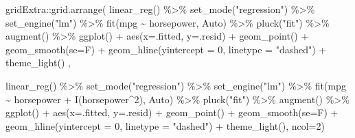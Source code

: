 \documentclass[
  letterpaper,
  DIV=11,
  numbers=noendperiod]{scrreprt}
\newenvironment{Shaded}{\begin{snugshade}}{\end{snugshade}}
\newcommand{\AttributeTok}[1]{\textcolor[rgb]{0.65,0.35,0.00}{#1}}
\newcommand{\DecValTok}[1]{\textcolor[rgb]{0.47,0.16,0.63}{#1}}
\newcommand{\FunctionTok}[1]{\textcolor[rgb]{0.02,0.16,0.49}{#1}}
\newcommand{\NormalTok}[1]{\textcolor[rgb]{0.33,0.33,0.33}{#1}}
\newcommand{\SpecialCharTok}[1]{\textcolor[rgb]{0.00,0.46,0.62}{#1}}
\newcommand{\StringTok}[1]{\textcolor[rgb]{0.00,0.50,0.00}{#1}}
\begin{document}
\begin{Shaded}
\begin{Highlighting}[]
\NormalTok{gridExtra}\SpecialCharTok{::}\FunctionTok{grid.arrange}\NormalTok{(}
\FunctionTok{linear\_reg}\NormalTok{() }\SpecialCharTok{\%\textgreater{}\%} 
  \FunctionTok{set\_mode}\NormalTok{(}\StringTok{"regression"}\NormalTok{) }\SpecialCharTok{\%\textgreater{}\%} 
  \FunctionTok{set\_engine}\NormalTok{(}\StringTok{"lm"}\NormalTok{) }\SpecialCharTok{\%\textgreater{}\%} 
  \FunctionTok{fit}\NormalTok{(mpg }\SpecialCharTok{\textasciitilde{}}\NormalTok{ horsepower, Auto) }\SpecialCharTok{\%\textgreater{}\%} 
  \FunctionTok{pluck}\NormalTok{(}\StringTok{"fit"}\NormalTok{) }\SpecialCharTok{\%\textgreater{}\%} 
  \FunctionTok{augment}\NormalTok{() }\SpecialCharTok{\%\textgreater{}\%} 
  \FunctionTok{ggplot}\NormalTok{() }\SpecialCharTok{+} \FunctionTok{aes}\NormalTok{(}\AttributeTok{x=}\NormalTok{.fitted, }\AttributeTok{y=}\NormalTok{.resid) }\SpecialCharTok{+} \FunctionTok{geom\_point}\NormalTok{() }\SpecialCharTok{+} \FunctionTok{geom\_smooth}\NormalTok{(}\AttributeTok{se=}\NormalTok{F) }\SpecialCharTok{+} \FunctionTok{geom\_hline}\NormalTok{(}\AttributeTok{yintercept =} \DecValTok{0}\NormalTok{, }\AttributeTok{linetype =} \StringTok{"dashed"}\NormalTok{) }\SpecialCharTok{+} \FunctionTok{theme\_light}\NormalTok{()}
\NormalTok{,}

\FunctionTok{linear\_reg}\NormalTok{() }\SpecialCharTok{\%\textgreater{}\%} 
  \FunctionTok{set\_mode}\NormalTok{(}\StringTok{"regression"}\NormalTok{) }\SpecialCharTok{\%\textgreater{}\%} 
  \FunctionTok{set\_engine}\NormalTok{(}\StringTok{"lm"}\NormalTok{) }\SpecialCharTok{\%\textgreater{}\%} 
  \FunctionTok{fit}\NormalTok{(mpg }\SpecialCharTok{\textasciitilde{}}\NormalTok{ horsepower }\SpecialCharTok{+} \FunctionTok{I}\NormalTok{(horsepower}\SpecialCharTok{\^{}}\DecValTok{2}\NormalTok{), Auto) }\SpecialCharTok{\%\textgreater{}\%} 
  \FunctionTok{pluck}\NormalTok{(}\StringTok{"fit"}\NormalTok{) }\SpecialCharTok{\%\textgreater{}\%} 
  \FunctionTok{augment}\NormalTok{() }\SpecialCharTok{\%\textgreater{}\%} 
  \FunctionTok{ggplot}\NormalTok{() }\SpecialCharTok{+} \FunctionTok{aes}\NormalTok{(}\AttributeTok{x=}\NormalTok{.fitted, }\AttributeTok{y=}\NormalTok{.resid) }\SpecialCharTok{+} \FunctionTok{geom\_point}\NormalTok{() }\SpecialCharTok{+} \FunctionTok{geom\_smooth}\NormalTok{(}\AttributeTok{se=}\NormalTok{F) }\SpecialCharTok{+} \FunctionTok{geom\_hline}\NormalTok{(}\AttributeTok{yintercept =} \DecValTok{0}\NormalTok{, }\AttributeTok{linetype =} \StringTok{"dashed"}\NormalTok{) }\SpecialCharTok{+} \FunctionTok{theme\_light}\NormalTok{(), }\AttributeTok{ncol=}\DecValTok{2}\NormalTok{)}
\end{Highlighting}
\end{Shaded}
\end{document}

